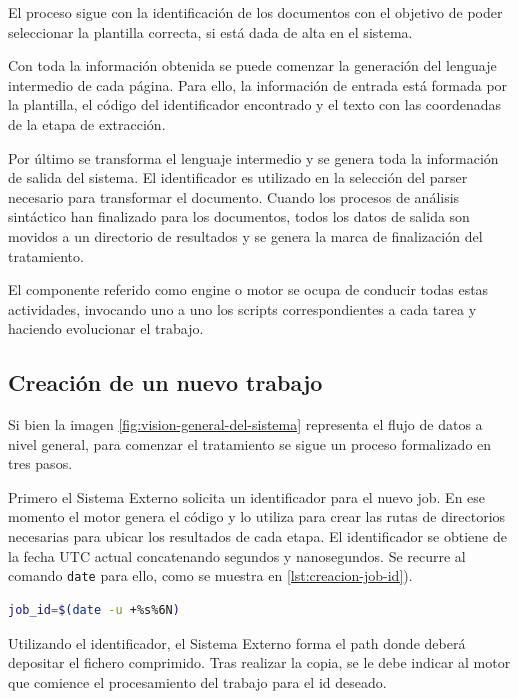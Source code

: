 El proceso sigue con la identificación de los documentos con el objetivo de poder seleccionar la plantilla correcta, si está dada de alta en el sistema. 

Con toda la información obtenida se puede comenzar la generación del lenguaje intermedio de cada página. Para ello, la información de entrada está formada por la plantilla, el código del identificador encontrado y el texto con las coordenadas de la etapa de extracción.

Por último se transforma el lenguaje intermedio y se genera toda la información de salida del sistema. El identificador es utilizado en la  selección del parser necesario para transformar el documento. Cuando los procesos de análisis sintáctico han finalizado para los documentos, todos los datos de salida son movidos a un directorio de resultados y se genera la marca de finalización del tratamiento.

El componente referido como engine o motor se ocupa de conducir todas estas actividades, invocando uno a uno los scripts correspondientes a cada tarea y haciendo evolucionar el trabajo.

\subsection{Creación de un nuevo trabajo}

Si bien la imagen \ref{fig:vision-general-del-sistema} representa el flujo de datos a nivel general, para comenzar el tratamiento se sigue un proceso formalizado en tres pasos. 

Primero el Sistema Externo solicita un identificador para el nuevo job. En ese momento el motor genera el código y lo utiliza para crear las rutas de directorios necesarias para ubicar los resultados de cada etapa. El identificador se obtiene de la fecha UTC actual concatenando segundos y nanosegundos. Se recurre al comando \verb|date| para ello, como se muestra en \ref{lst:creacion-job-id}).

\begin{lstlisting}[language=bash,caption={Obtención del identificador de un trabajo},label=lst:creacion-job-id]
job_id=$(date -u +%s%6N)
\end{lstlisting}

Utilizando el identificador, el Sistema Externo forma el path donde deberá depositar el fichero comprimido. Tras realizar la copia, se le debe indicar al motor que comience el procesamiento del trabajo para el id deseado.

